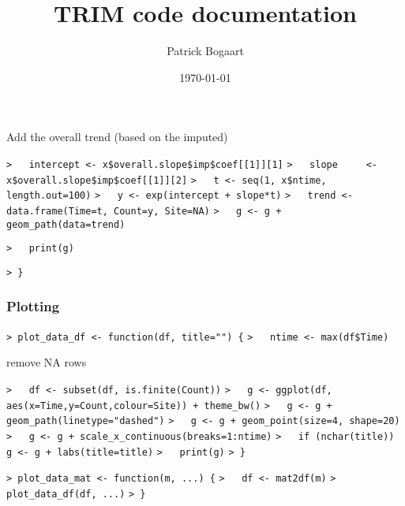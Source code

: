\documentclass[a4paper]{article}
\begin{document}
Add the overall trend (based on the imputed)\par
\verb~>   intercept <- x$overall.slope$imp$coef[[1]][1]~\newline
\verb~>   slope     <- x$overall.slope$imp$coef[[1]][2]~\newline
\verb~>   t <- seq(1, x$ntime, length.out=100)~\newline
\verb~>   y <- exp(intercept + slope*t)~\newline
\verb~>   trend <- data.frame(Time=t, Count=y, Site=NA)~\newline
\verb~>   g <- g + geom_path(data=trend)~\par

\verb~>   print(g)~\par

\verb~> }~\par




\subsubsection{Plotting}\par


\verb~> plot_data_df <- function(df, title="") {~\newline
\verb~>   ntime <- max(df$Time)~\par
remove NA rows\par
\verb~>   df <- subset(df, is.finite(Count))~\newline
\verb~>   g <- ggplot(df, aes(x=Time,y=Count,colour=Site)) + theme_bw()~\newline
\verb~>   g <- g + geom_path(linetype="dashed")~\newline
\verb~>   g <- g + geom_point(size=4, shape=20)~\newline
\verb~>   g <- g + scale_x_continuous(breaks=1:ntime)~\newline
\verb~>   if (nchar(title)) g <- g + labs(title=title)~\newline
\verb~>   print(g)~\newline
\verb~> }~\par


\verb~> plot_data_mat <- function(m, ...) {~\newline
\verb~>   df <- mat2df(m)~\newline
\verb~>   plot_data_df(df, ...)~\newline
\verb~> }~\par


\title{TRIM code documentation}
\author{Patrick Bogaart}
\date{\today}\par
\end{document}
